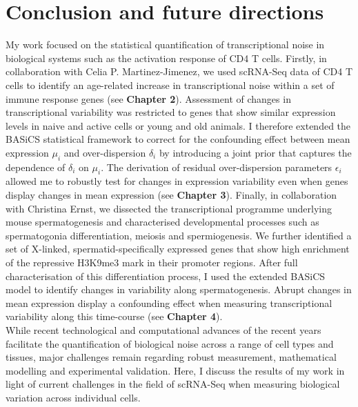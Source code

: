 
\graphicspath{{"../../Dropbox (Cambridge  University)/Figures_for_thesis/Discussion/"}}

\chapter{Conclusion and future directions}  

My work focused on the statistical quantification of transcriptional noise in biological systems such as the activation response of CD4\plus{} T cells. Firstly, in collaboration with Celia P. Martinez-Jimenez, we used scRNA-Seq data of CD4\plus{} T cells to identify an age-related increase in transcriptional noise within a set of immune response genes (see \textbf{Chapter 2}). Assessment of changes in transcriptional variability was restricted to genes that show similar expression levels in naive and active cells or young and old animals. I therefore extended the BASiCS statistical framework to correct for the confounding effect between mean expression $\mu_i$ and over-dispersion $\delta_i$ by introducing a joint prior that captures the dependence of $\delta_i$ on $\mu_i$. The derivation of residual over-dispersion parameters $\epsilon_i$ allowed me to robustly test for changes in expression variability even when genes display changes in mean expression (see \textbf{Chapter 3}). Finally, in collaboration with Christina Ernst, we dissected the transcriptional programme underlying mouse spermatogenesis and characterised developmental processes such as spermatogonia differentiation, meiosis and spermiogenesis. We further identified a set of X-linked, spermatid-specifically expressed genes that show high enrichment of the repressive H3K9me3 mark in their promoter regions. After full characterisation of this differentiation process, I used the extended BASiCS model to identify changes in variability along spermatogenesis.   Abrupt changes in mean expression display a confounding effect when measuring transcriptional variability along this time-course (see \textbf{Chapter 4}).  \\

While recent technological and computational advances of the recent years facilitate the quantification of biological noise across a range of cell types and tissues, major challenges remain regarding robust measurement, mathematical modelling and experimental validation. Here, I discuss the results of my work in light of current challenges in the field of scRNA-Seq when measuring biological variation across individual cells.

